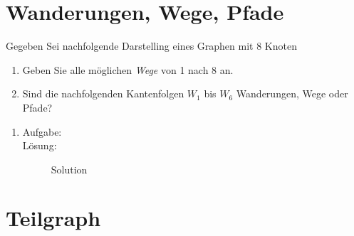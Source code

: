 \documentclass[a4paper,11pt]{report}
\begin{document}
\chapter{Wanderungen, Wege, Pfade}
Gegeben Sei nachfolgende Darstelling eines Graphen mit 8 Knoten

\begin{enumerate}
    \item Geben Sie alle möglichen \textit{Wege} von 1 nach 8 an.
    \item Sind die nachfolgenden Kantenfolgen $W_1$ bis $W_6$ Wanderungen, Wege oder Pfade?
\end{enumerate}

\begin{enumerate}
    \item \label{item:backrefA} \hfill %
    \begin{description}
        \item[Aufgabe:] 
         \hfill
        \item[Lösung:] \hfill \newline %
            Solution
    \end{description}
\end{enumerate}
\newpage


\chapter{Teilgraph}
\end{document}
